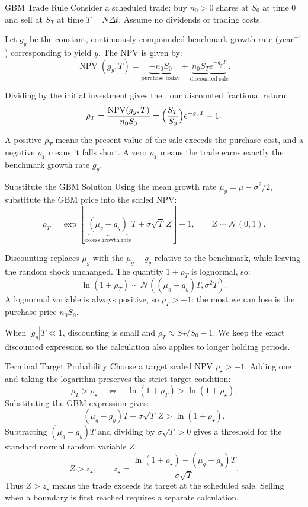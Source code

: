 \documentclass[aspectratio=169,11pt]{beamer}
\newcommand{\mug}{\mu_g}
\begin{document}
\begin{frame}{GBM Trade Rule}
  Consider a scheduled trade: buy $n_0>0$ shares at $S_0$
  at time $0$ and sell at $S_T$ at time $T=N\Delta t$. Assume no dividends
  or trading costs.

  \vspace{0.4em}
  Let $g_y$ be the constant, continuously compounded benchmark growth rate
  (year$^{-1}$) corresponding to yield $y$. The NPV is given by:
  \[
    \operatorname{NPV}(g_y,T)
    =\underbrace{-n_0S_0}_{\text{purchase today}}
    +\underbrace{n_0S_Te^{-g_yT}}_{\text{discounted sale}}.
  \]

  Dividing by the initial investment gives the , our
  discounted fractional return:
  \[
    \rho_T=\frac{\operatorname{NPV}(g_y,T)}{n_0S_0}
    =\Bigl(\frac{S_T}{S_0}\Bigr)e^{-g_yT}-1.
  \]

  A positive $\rho_T$ means the present value of the sale exceeds the purchase
  cost, and a negative $\rho_T$ means it falls short. A zero $\rho_T$ means
  the trade earns exactly the benchmark growth rate $g_y$.
\end{frame}

\begin{frame}{Substitute the GBM Solution}
  Using the mean growth rate $\mug=\mu-\sigma^2/2$, substitute the GBM price into
  the scaled NPV:
  \[
    \boxed{\rho_T=\exp\!\left[\underbrace{(\mug-g_y)}_{\text{excess growth rate}}T+\sigma\sqrt T\,Z\right]-1,
      \qquad Z\sim\mathcal N(0,1).}
  \]
  \vspace{0.2em}

  Discounting replaces $\mug$ with the  $\mug-g_y$
  relative to the benchmark, while leaving the random shock unchanged. The
  quantity $1+\rho_T$ is lognormal, so:
  \[
    \ln(1+\rho_T)\sim\mathcal N\!\left((\mug-g_y)T,\sigma^2T\right).
  \]
  A lognormal variable is always positive, so $\rho_T>-1$: the most we can
  lose is the purchase price $n_0S_0$.

  \vspace{0.3em}
  When $|g_y|T\ll1$, discounting is small and $\rho_T\approx S_T/S_0-1$. We
  keep the exact discounted expression so the calculation also applies to
  longer holding periods.
\end{frame}

\begin{frame}{Terminal Target Probability}
  Choose a target scaled NPV $\rho_\star>-1$. Adding one and taking the
  logarithm preserves the strict target condition:
  \[
    \rho_T>\rho_\star
    \quad\Longleftrightarrow\quad
    \ln(1+\rho_T)>\ln(1+\rho_\star).
  \]
  Substituting the GBM expression gives:
  \[
    (\mug-g_y)T+\sigma\sqrt T\,Z>\ln(1+\rho_\star).
  \]
  Subtracting $(\mug-g_y)T$ and dividing by $\sigma\sqrt T>0$ gives a
  threshold for the standard normal random variable $Z$:
  \[
    Z>z_\star,\qquad
    \boxed{z_\star=\frac{\ln(1+\rho_\star)-(\mug-g_y)T}{\sigma\sqrt T}.}
  \]
  Thus $Z>z_\star$ means the trade exceeds its target at the scheduled sale.
  Selling when a boundary is first reached requires a separate calculation.
\end{frame}
\end{document}
